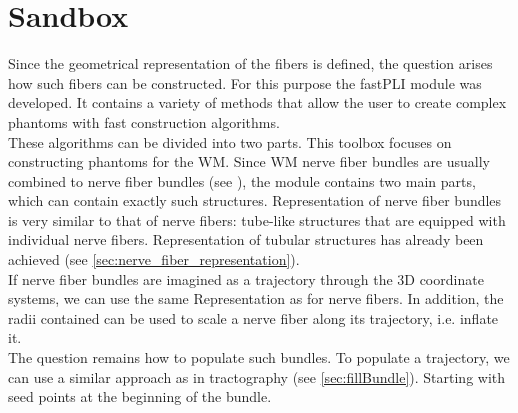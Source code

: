\section{Sandbox}
% 
Since the geometrical representation of the fibers is defined, the question arises how such fibers can be constructed.
For this purpose the \ac{fastPLI} module  was developed.
It contains a variety of methods that allow the user to create complex phantoms with fast construction algorithms.
\\
% 
These algorithms can be divided into two parts.
This toolbox focuses on constructing phantoms for the \ac{WM}.
Since \ac{WM} nerve fiber bundles are usually combined to nerve fiber bundles (see \dummy{}), the  module contains two main parts, which can contain exactly such structures.
%
Representation of nerve fiber bundles is very similar to that of nerve fibers: tube-like structures that are equipped with individual nerve fibers.
Representation of tubular structures has already been achieved (see \cref{sec:nerve_fiber_representation}).
\\
If nerve fiber bundles are imagined as a trajectory through the 3D coordinate systems, we can use the same Representation as for nerve fibers.
In addition, the radii contained can be used to scale a nerve fiber along its trajectory, i.e. inflate it.
\\
% 
The question remains how to populate such bundles.
To populate a trajectory, we can use a similar approach as in tractography (see \cref{sec:fillBundle}).
Starting with seed points at the beginning of the bundle.
% 
